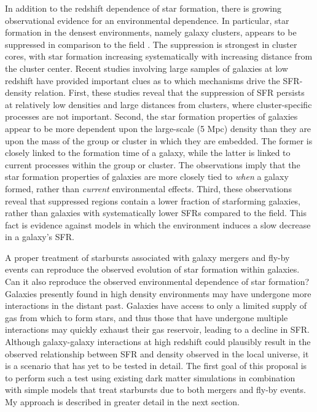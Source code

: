 \documentclass[12pt]{plan}
\begin{document}
In addition to the redshift dependence of star formation, there is
growing observational evidence for an environmental dependence. In
particular, star formation in the densest environments, namely galaxy
clusters, appears to be suppressed in comparison to the field
\cite{Couch87,Abraham96,Poggianti99,Balogh99,Balogh00b,Couch01,Postman01,Balogh02a,Pimbblet02}.
The suppression is strongest in cluster cores, with star formation
increasing systematically with increasing distance from the cluster
center.  Recent studies involving large samples of galaxies at low
redshift have provided important clues as to which mechanisms drive
the SFR-density relation\cite{Lewis02,Gomez03}.  First,
these studies reveal that the suppression of SFR persists at
relatively low densities and large distances from clusters, where cluster-specific processes
are not important.  Second, the star formation properties of galaxies
appear to be more dependent upon the large-scale (5 Mpc) density than
they are upon the mass of the group or cluster in which they are
embedded\cite{Balogh03a}.  The former is closely linked to the
formation time of a galaxy, while the latter is
linked to current processes within the group or cluster.  The
observations imply that the star formation properties of galaxies are
more closely tied to \emph{when} a galaxy formed, rather than
\emph{current} environmental effects.  Third, these observations
reveal that suppressed regions contain a lower fraction of starforming
galaxies, rather than galaxies with systematically lower SFRs compared
to the field.  This fact is evidence against models in which the
environment induces a slow decrease in a galaxy's SFR.


A proper treatment of starbursts associated with galaxy mergers and
fly-by events can reproduce the observed evolution of star formation
within galaxies.  Can it also reproduce the observed environmental
dependence of star formation?  Galaxies presently found in high
density environments may have undergone more interactions in the
distant past.  Galaxies have access to only a limited supply of gas
from which to form stars, and thus those that have undergone multiple
interactions may quickly exhaust their gas reservoir, leading to a
decline in SFR.  Although galaxy-galaxy interactions at high redshift
could plausibly result in the observed relationship between SFR and
density observed in the local universe, it is a scenario that has yet
to be tested in detail.  The first goal of this proposal is to perform such a test using existing dark
matter simulations in combination with simple models that treat
starbursts due to both mergers and fly-by events.  My approach is
described in greater detail in the next section.
\end{document}
